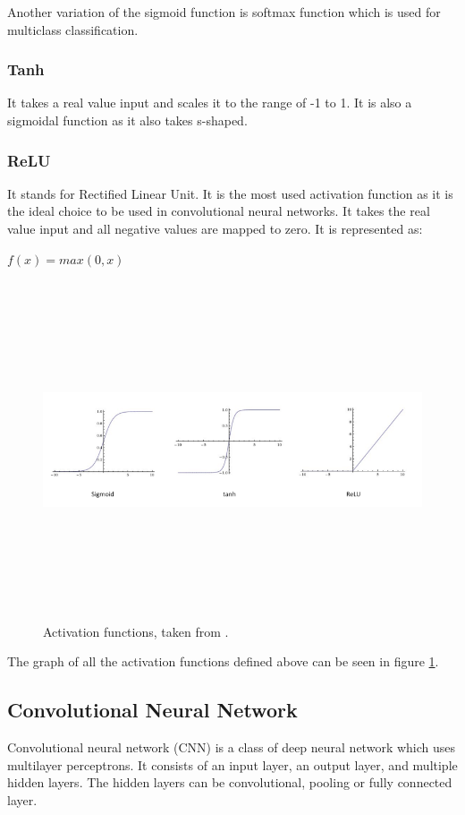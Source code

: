 Another variation of the sigmoid function is softmax function which is used for multiclass classification.

\subsubsection{Tanh}
It takes a real value input and scales it to the range of -1 to 1. It is also a sigmoidal function as it also takes s-shaped.


\subsubsection{ReLU}
It stands for Rectified Linear Unit. It is the most used activation function as it is the ideal choice to be used in convolutional neural networks. It takes the real value input and all negative values are mapped to zero. It is represented as:

\begin{center}
	$f(x) = max(0, x)$
\end{center}

\begin{figure}[htpb]
	\centering
	\includegraphics[width=15cm,height=10cm,keepaspectratio=true]{images/act-funcs}
	\caption{
		Activation functions, taken from \cite{ujjwalkarn}.
	}
	\label{fig:funcs}
\end{figure}

The graph of all the activation functions defined above can be seen in figure \ref{fig:funcs}.

\subsection{Convolutional Neural Network}
Convolutional neural network (CNN) is a class of deep neural network which uses multilayer perceptrons. It consists of an input layer, an output layer, and multiple hidden layers. The hidden layers can be convolutional, pooling or fully connected layer.



